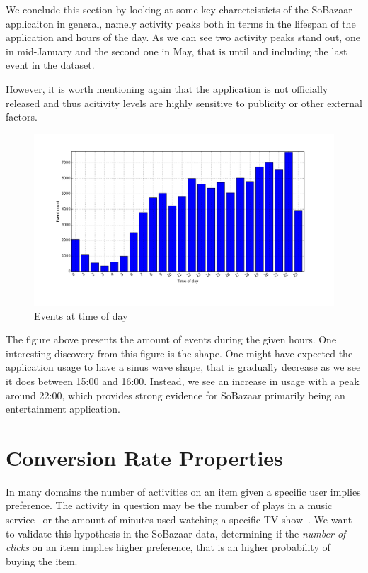 We conclude this section by looking at some key charecteisticts of the SoBazaar
applicaiton in general, namely activity peaks both in terms in the lifespan of
the application and hours of the day. As we can see two activity peaks stand
out, one in mid-January and the second one in May, that is until and including
the last event in the dataset.

However, it is worth mentioning again that the application is not officially
released and thus acitivity levels are highly sensitive to publicity or other
external factors.

\begin{figure}[H]
  \centering
  \includegraphics[width=5in]{image/hrdistribution.png}
  \caption{Events at time of day}
  \label{figure:timeOfDayDistr}
\end{figure}

The figure above presents the amount of events during the given hours. One
interesting discovery from this figure is the shape. One might have expected
the application usage to have a sinus wave shape, that is gradually decrease as
we see it does between 15:00 and 16:00. Instead, we see an increase in usage
with a peak around 22:00, which provides strong evidence for SoBazaar primarily
being an entertainment application.

\section{Conversion Rate Properties}
\label{sec:conv-rate}

In many domains the number of activities on an item given a specific user
implies preference. The activity in question may be the number of plays in a
music service~\cite{parra2011walk} or the amount of minutes used watching a
specific TV-show~\cite{study-on-implicit-tv}. We want to validate this
hypothesis in the SoBazaar data, determining if the \textit{number of clicks}
on an item implies higher preference, that is an higher probability of buying
the item.

